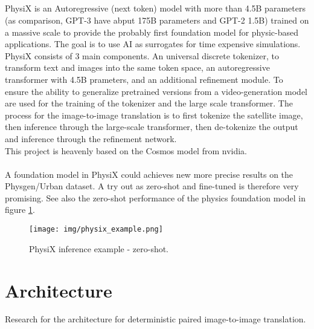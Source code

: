 		\subsection{}
			PhysiX is an Autoregressive (next token) model with more than 4.5B parameters (as comparison, GPT-3 have abput 175B parameters and GPT-2 1.5B) trained on a massive scale to provide the probably first foundation model for physic-based applications. The goal is to use AI as surrogates for time expensive simulations. 
			PhysiX consists of 3 main components. An universal discrete tokenizer, to transform text and images into the same token space, an autoregressive transformer with 4.5B prameters, and an additional refinement module.
			To ensure the ability to generalize pretrained versions from a video-generation model are used  for the training of the tokenizer and the large scale transformer.
			The process for the image-to-image translation is to first tokenize the satellite image, then inference through the large-scale transformer, then de-tokenize the output and inference through the refinement network.\\
			This project is heavenly based on the Cosmos model from nvidia.\\
			\\
			A foundation model in PhysiX could achieves new more precise results on the Physgen/Urban dataset. A try out as zero-shot and fine-tuned is therefore very promising. See also the zero-shot performance of the physics foundation model in figure \ref{fig:physix}.
			\begin{figure}[H]
				\centering
				\texttt{[image: img/physix\_example.png]}
				\caption[PhysiX inference example - zero-shot.]{PhysiX inference example - zero-shot.}
				\label{fig:physix}
			\end{figure}
			
	
	
	\newpage
	\section{Architecture}
	\label{sec:lit-architecture}
		Research for the architecture for deterministic paired image-to-image translation.
		
